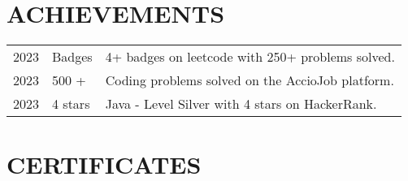 \documentclass[]{deedy-resume-openfont}
\begin{document}
\begin{minipage}[t]{0.66\textwidth}





\section{ACHIEVEMENTS}

\begin{tabular}{rll}
2023	  & Badges  &  4+ badges on leetcode with 250+ problems solved.\\
2023	  & 500 +  & Coding problems solved on the AccioJob platform. \\
2023      & 4 stars & Java - Level Silver with 4 stars on HackerRank. \\


\end{tabular}

 \vspace{\topsep}

\section{CERTIFICATES}

\runsubsection{}
    

\end{minipage}
\end{document}
